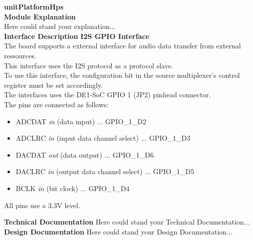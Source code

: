 \documentclass[../../../../doc/ASP-SoC_doc/main.tex]{subfiles}
\begin{document}
\textbf{unitPlatformHps}
\\

\textbf{Module Explanation}
\\
	Here could stand your explanation...\\
\textbf{Interface Description}
\textbf{I2S GPIO Interface}
\\
	The board supports a external interface for audio data transfer from external ressources. \\
	This interface uses the I2S protocol as a protocol slave.\\
	To use this interface, the configuration bit in the source multiplexer's control register must be set accordingly.\\
	The interfaces uses the DE1-SoC GPIO 1 (JP2) pinhead connector. \\
	The pins are connected as follows:
	\begin{itemize}
		\item ADCDAT \textit{in} (data input) ... GPIO\_1\_D2
		\item ADCLRC \textit{in} (input data channel select) ... GPIO\_1\_D3
		\item DACDAT \textit{out} (data output) ... GPIO\_1\_D6
		\item DACLRC \textit{in} (output data channel select) ... GPIO\_1\_D5
		\item BCLK   \textit{in} (bit clock) ... GPIO\_1\_D4
	\end{itemize}
	All pins use a 3.3V level.

\textbf{Technical Documentation}
	Here could stand your Technical Documentation...\\

\textbf{Design Documentation}
	Here could stand your Design Documentation...\\
\end{document}
